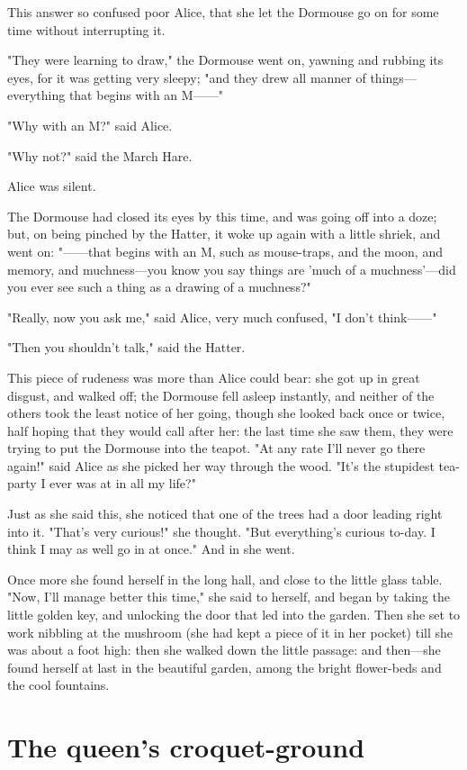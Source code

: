 ​This answer so confused poor Alice, that she let the Dormouse go on for some time without interrupting it.

"They were learning to draw," the Dormouse went on, yawning and rubbing its eyes, for it was getting very sleepy; "and they drew all manner of things—everything that begins with an M——"

"Why with an M?" said Alice.

"Why not?" said the March Hare.

Alice was silent.

The Dormouse had closed its eyes by this time, and was going off into a doze; but, on being pinched by the Hatter, it woke up again with a little shriek, and went on: "——that begins with an M, such as mouse-traps, and the moon, and memory, and muchness—you know you say things are 'much of a muchness'—did you ever see such a thing as a drawing of a muchness?"

"Really, now you ask me," said Alice, very much confused, "I don't think——"

​"Then you shouldn't talk," said the Hatter.

This piece of rudeness was more than Alice could bear: she got up in great disgust, and walked off; the Dormouse fell asleep instantly, and neither of the others took the least notice
of her going, though she looked back once or twice, half hoping that they would call after her: the last time she saw them, they were trying to put the Dormouse into the teapot.
"At any rate I'll never go there again!" said ​Alice as she picked her way through the wood. "It's the stupidest tea-party I ever was at in all my life?"

Just as she said this, she noticed that one of the trees had a door leading right into it. "That's very curious!" she thought. "But everything's curious to-day. I think I may as well go in at once." And in she went.

Once more she found herself in the long hall, and close to the little glass table. "Now, I'll manage better this time," she said to herself, and began by taking the little golden key, and unlocking the door that led into the garden. Then she set to work nibbling at the mushroom (she had kept a piece of it in her pocket) till she was about a foot high: then she walked down the little passage: and then—she found herself at last in the beautiful garden, among the bright flower-beds and the cool fountains.

\quebra\chapter*{The queen's croquet-ground}

